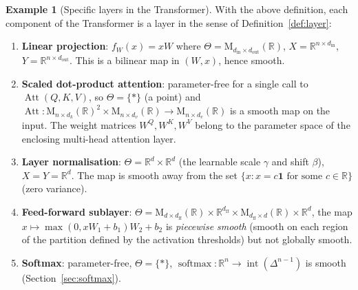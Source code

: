 \documentclass[11pt]{amsart}
\theoremstyle{plain}
\theoremstyle{definition}
\newtheorem{example}[theorem]{Example}
\newcommand{\R}{\mathbb{R}}
\newcommand{\Mat}[2]{\mathrm{M}_{#1 \times #2}(\R)}
\newcommand{\softmax}{\operatorname{softmax}}
\newcommand{\Att}{\operatorname{Att}}
\begin{document}
\begin{example}[Specific layers in the Transformer]
\label{ex:transformer-layers}
With the above definition, each component of the Transformer is a layer in the
sense of Definition~\ref{def:layer}:
\begin{enumerate}[label=(\arabic*)]
    \item \textbf{Linear projection}: $f_W(x) = xW$ where $\Theta = \Mat{d_{\mathrm{in}}}{d_{\mathrm{out}}}$,
    $X = \mathbb{R}^{n \times d_{\mathrm{in}}}$, $Y = \mathbb{R}^{n \times d_{\mathrm{out}}}$.
    This is a bilinear map in $(W, x)$, hence smooth.

    \item \textbf{Scaled dot-product attention}: parameter-free for a single
    call to $\Att(Q,K,V)$, so $\Theta = \{*\}$ (a point) and $\Att :
    \Mat{n}{d_k}^2 \times \Mat{n}{d_v} \to \Mat{n}{d_v}$ is a smooth map on
    the input.  The weight matrices $W^Q, W^K, W^V$ belong to the parameter
    space of the enclosing multi-head attention layer.

    \item \textbf{Layer normalisation}: $\Theta = \mathbb{R}^d \times \mathbb{R}^d$
    (the learnable scale $\gamma$ and shift $\beta$), $X = Y = \mathbb{R}^d$.
    The map is smooth away from the set $\{x : x = c\mathbf{1} \text{ for some }
    c \in \mathbb{R}\}$ (zero variance).

    \item \textbf{Feed-forward sublayer}: $\Theta = \Mat{d}{d_{\mathrm{ff}}}
    \times \mathbb{R}^{d_{\mathrm{ff}}} \times \Mat{d_{\mathrm{ff}}}{d} \times
    \mathbb{R}^d$, the map $x \mapsto \max(0, xW_1 + b_1)W_2 + b_2$ is
    \emph{piecewise smooth} (smooth on each region of the partition defined by
    the activation thresholds) but not globally smooth.

    \item \textbf{Softmax}: parameter-free, $\Theta = \{*\}$,
    $\softmax : \mathbb{R}^n \to \operatorname{int}(\Delta^{n-1})$ is smooth
    (Section~\ref{sec:softmax}).
\end{enumerate}
\end{example}
\end{document}
